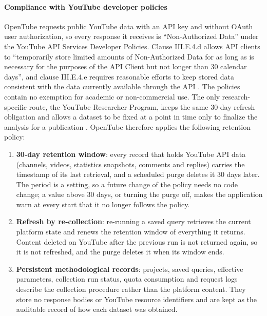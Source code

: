 \paragraph{Compliance with YouTube developer policies}

OpenTube requests public YouTube data with an API key and without OAuth user authorization, so every response it receives is \enquote{Non-Authorized Data} under the YouTube API Services Developer Policies. Clause III.E.4.d allows API clients to \enquote{temporarily store limited amounts of Non-Authorized Data for as long as is necessary for the purposes of the API Client but not longer than 30 calendar days}, and clause III.E.4.e requires reasonable efforts to keep stored data consistent with the data currently available through the API \autocite{youtube_api_services_developer_policies}. The policies contain no exemption for academic or non-commercial use. The only research-specific route, the YouTube Researcher Program, keeps the same 30-day refresh obligation and allows a dataset to be fixed at a point in time only to finalize the analysis for a publication \autocite{youtube_researcher_program_terms}. OpenTube therefore applies the following retention policy:

\begin{enumerate}
    \item \textbf{30-day retention window}: every record that holds YouTube API data (channels, videos, statistics snapshots, comments and replies) carries the timestamp of its last retrieval, and a scheduled purge deletes it 30 days later. The period is a setting, so a future change of the policy needs no code change; a value above 30 days, or turning the purge off, makes the application warn at every start that it no longer follows the policy. %

    \item \textbf{Refresh by re-collection}: re-running a saved query retrieves the current platform state and renews the retention window of everything it returns. Content deleted on YouTube after the previous run is not returned again, so it is not refreshed, and the purge deletes it when its window ends.

    \item \textbf{Persistent methodological records}: projects, saved queries, effective parameters, collection run status, quota consumption and request logs describe the collection procedure rather than the platform content. They store no response bodies or YouTube resource identifiers and are kept as the auditable record of how each dataset was obtained.
\end{enumerate}

